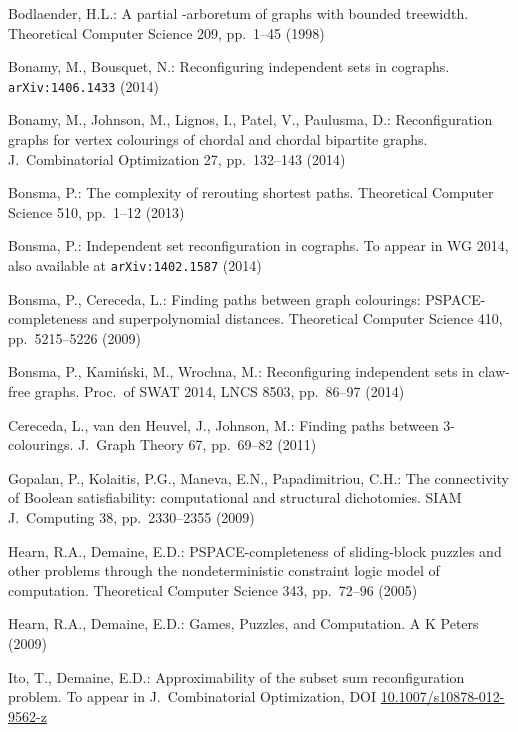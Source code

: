 \documentclass{llncs}
\begin{document}

\begin{thebibliography}{10}

Bodlaender, H.L.:
A partial -arboretum of graphs with bounded treewidth.
Theoretical Computer Science 209, pp.~1--45 (1998)

Bonamy, M., Bousquet, N.:
Reconfiguring independent sets in cographs.
{\tt arXiv:1406.1433} (2014)
   
Bonamy, M., Johnson, M., Lignos, I., Patel, V., Paulusma, D.: 
Reconfiguration graphs for vertex colourings of chordal and chordal bipartite graphs. 
J.~Combinatorial Optimization 27, pp.~132--143 (2014)

Bonsma, P.: 
The complexity of rerouting shortest paths. 
Theoretical Computer Science 
510, pp.~1--12 (2013)

Bonsma, P.: 
Independent set reconfiguration in cographs. 
To appear in WG 2014, also available at {\tt arXiv:1402.1587} (2014)

Bonsma, P., Cereceda, L.: 
Finding paths between graph colourings: PSPACE-completeness and superpolynomial distances. 
Theoretical Computer Science 
410, pp.~5215--5226 (2009)  

Bonsma, P., Kami\'nski, M., Wrochna, M.: 
Reconfiguring independent sets in claw-free graphs.
Proc.~of SWAT 2014, LNCS 8503, pp.~86--97 (2014)


Cereceda, L., van den Heuvel, J., Johnson, M.:  
Finding paths between 3-colourings. 
J.~Graph Theory 67, pp.~69--82 (2011)

Gopalan, P., Kolaitis, P.G., Maneva, E.N., Papadimitriou, C.H.:
The connectivity of Boolean satisfiability: computational and structural dichotomies.
SIAM J.~Computing 38, pp.~2330--2355 (2009)  

Hearn, R.A., Demaine, E.D.: 
PSPACE-completeness of sliding-block puzzles and other problems through the nondeterministic constraint logic model of computation. 
Theoretical Computer Science 
343, pp.~72--96 (2005) 

Hearn, R.A., Demaine, E.D.: 
Games, Puzzles, and Computation.
A K Peters (2009)

Ito, T., Demaine, E.D.:
Approximability of the subset sum reconfiguration problem.
To appear in J.~Combinatorial Optimization, DOI \url{10.1007/s10878-012-9562-z}


\end{thebibliography}
\end{document}

